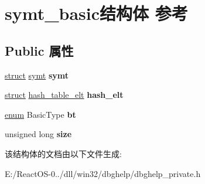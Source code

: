\hypertarget{structsymt__basic}{}\section{symt\+\_\+basic结构体 参考}
\label{structsymt__basic}
\subsection*{Public 属性}
\begin{DoxyCompactItemize}
\item 
\mbox{\label{structsymt__basic_a5730819b78a51c692f41182be5e9bab1}} 
\hyperlink{interfacestruct}{struct} \hyperlink{structsymt}{symt} {\bfseries symt}
\item 
\mbox{\label{structsymt__basic_a756c7a82b035f5c8a8f5f2b02e7c285f}} 
\hyperlink{interfacestruct}{struct} \hyperlink{structhash__table__elt}{hash\+\_\+table\+\_\+elt} {\bfseries hash\+\_\+elt}
\item 
\mbox{\label{structsymt__basic_a51915c6bd2917ba803247e6663c1df53}} 
\hyperlink{interfaceenum}{enum} Basic\+Type {\bfseries bt}
\item 
\mbox{\label{structsymt__basic_a6614d4a06ca16e0c59014b851e98746c}} 
unsigned long {\bfseries size}
\end{DoxyCompactItemize}


该结构体的文档由以下文件生成\+:\begin{DoxyCompactItemize}
\item 
E\+:/\+React\+O\+S-\/0../dll/win32/dbghelp/dbghelp\+\_\+private.\+h\end{DoxyCompactItemize}
